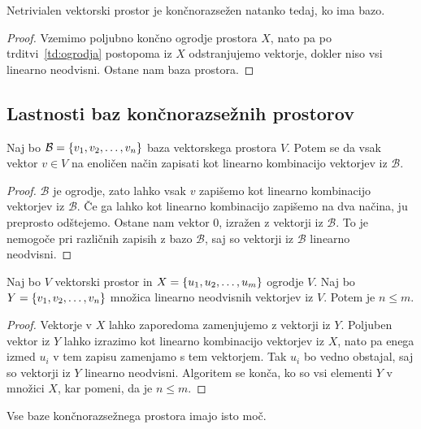 \documentclass[12pt, a4paper]{article}
\begin{document}
\begin{izrek}
Netrivialen vektorski prostor je končnorazsežen natanko tedaj, ko ima bazo.
\end{izrek}

\begin{proof}
Vzemimo poljubno končno ogrodje prostora $X$, nato pa po trditvi~\ref{td:ogrodja} postopoma iz $X$ odstranjujemo vektorje, dokler niso vsi linearno neodvisni. Ostane nam baza prostora.
\end{proof}

\newpage

\subsection{Lastnosti baz končnorazsežnih prostorov}

\begin{trditev}
Naj bo $\mathcal{B}=\left\{v_1,v_2,\dots,v_n\right\}$ baza vektorskega prostora $V$. Potem se da vsak vektor $v\in V$ na enoličen način zapisati kot linearno kombinacijo vektorjev iz $\mathcal{B}$.
\end{trditev}

\begin{proof}
$\mathcal{B}$ je ogrodje, zato lahko vsak $v$ zapišemo kot linearno kombinacijo vektorjev iz $\mathcal{B}$. Če ga lahko kot linearno kombinacijo zapišemo na dva načina, ju preprosto odštejemo. Ostane nam vektor $0$, izražen z vektorji iz $\mathcal{B}$. To je nemogoče pri različnih zapisih z bazo $\mathcal{B}$, saj so vektorji iz $\mathcal{B}$ linearno neodvisni.
\end{proof}

\begin{lema}\label{lm:ineq}
Naj bo $V$ vektorski prostor in $X=\left\{u_1,u_2,\dots,u_m\right\}$ ogrodje $V$. Naj bo $Y=\left\{v_1,v_2,\dots,v_n\right\}$ množica linearno neodvisnih vektorjev iz $V$. Potem je $n\leq m$.
\end{lema}

\begin{proof}
Vektorje v $X$ lahko zaporedoma zamenjujemo z vektorji iz $Y$. Poljuben vektor iz $Y$ lahko izrazimo kot linearno kombinacijo vektorjev iz $X$, nato pa enega izmed $u_i$ v tem zapisu zamenjamo s tem vektorjem. Tak $u_i$ bo vedno obstajal, saj so vektorji iz $Y$ linearno neodvisni. Algoritem se konča, ko so vsi elementi $Y$ v množici $X$, kar pomeni, da je $n\leq m$.
\end{proof}

\begin{posledica}
Vse baze končnorazsežnega prostora imajo isto moč.
\end{posledica}
\end{document}
